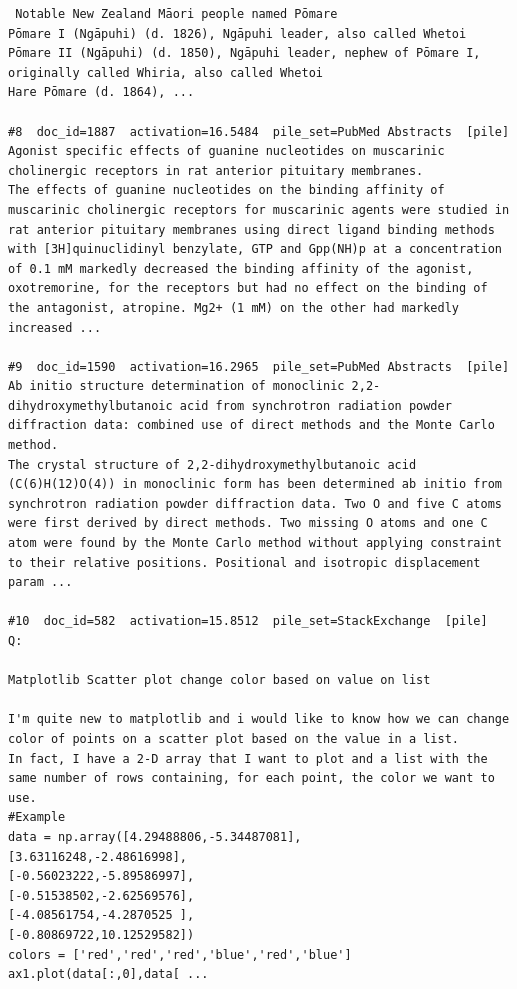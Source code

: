 \begin{verbatim}
 Notable New Zealand Māori people named Pōmare
Pōmare I (Ngāpuhi) (d. 1826), Ngāpuhi leader, also called Whetoi
Pōmare II (Ngāpuhi) (d. 1850), Ngāpuhi leader, nephew of Pōmare I, originally called Whiria, also called Whetoi
Hare Pōmare (d. 1864), ...

#8  doc_id=1887  activation=16.5484  pile_set=PubMed Abstracts  [pile]
Agonist specific effects of guanine nucleotides on muscarinic cholinergic receptors in rat anterior pituitary membranes.
The effects of guanine nucleotides on the binding affinity of muscarinic cholinergic receptors for muscarinic agents were studied in rat anterior pituitary membranes using direct ligand binding methods with [3H]quinuclidinyl benzylate, GTP and Gpp(NH)p at a concentration of 0.1 mM markedly decreased the binding affinity of the agonist, oxotremorine, for the receptors but had no effect on the binding of the antagonist, atropine. Mg2+ (1 mM) on the other had markedly increased ...

#9  doc_id=1590  activation=16.2965  pile_set=PubMed Abstracts  [pile]
Ab initio structure determination of monoclinic 2,2-dihydroxymethylbutanoic acid from synchrotron radiation powder diffraction data: combined use of direct methods and the Monte Carlo method.
The crystal structure of 2,2-dihydroxymethylbutanoic acid (C(6)H(12)O(4)) in monoclinic form has been determined ab initio from synchrotron radiation powder diffraction data. Two O and five C atoms were first derived by direct methods. Two missing O atoms and one C atom were found by the Monte Carlo method without applying constraint to their relative positions. Positional and isotropic displacement param ...

#10  doc_id=582  activation=15.8512  pile_set=StackExchange  [pile]
Q:

Matplotlib Scatter plot change color based on value on list

I'm quite new to matplotlib and i would like to know how we can change color of points on a scatter plot based on the value in a list.
In fact, I have a 2-D array that I want to plot and a list with the same number of rows containing, for each point, the color we want to use.
#Example
data = np.array([4.29488806,-5.34487081],
[3.63116248,-2.48616998],
[-0.56023222,-5.89586997],
[-0.51538502,-2.62569576],
[-4.08561754,-4.2870525 ],
[-0.80869722,10.12529582])
colors = ['red','red','red','blue','red','blue']
ax1.plot(data[:,0],data[ ...

\end{verbatim}

